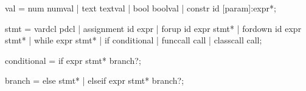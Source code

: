     val         =   {num} numval
                |   {text} textval
                |   {bool} boolval
                |   {constr} id [param]:expr*;

    stmt        =   {vardcl} pdcl
                |   {assignment} id expr
                |   {forup} id expr stmt*
                |   {fordown} id expr stmt*
                |   {while} expr stmt*
                |   {if} conditional
                |   {funccall} call
                |   {classcall} call;


    conditional  =   {if} expr stmt* branch?;

    branch      =   {else} stmt*
                |   {elseif} expr stmt* branch?;